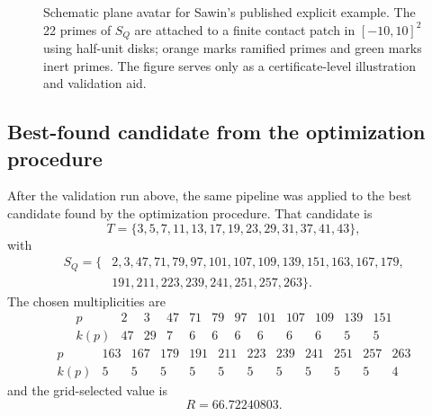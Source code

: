 \documentclass[a4paper,12pt]{article}
\begin{document}
\begin{figure}[htbp]
\caption{Schematic plane avatar for Sawin's published explicit example.  The 22 primes of $S_Q$ are attached to a finite contact patch in $[-10,10]^2$ using half-unit disks; orange marks ramified primes and green marks inert primes.  The figure serves only as a certificate-level illustration and validation aid.}
\label{fig:sawin-plane}
\end{figure}

\subsection*{Best-found candidate from the optimization procedure}



After the validation run above, the same pipeline was applied to the best candidate found by the optimization procedure.  That candidate is
\[
T=\{3,5,7,11,13,17,19,23,29,31,37,41,43\},
\]
with
\[
\begin{split}
S_Q=\{&2,3,47,71,79,97,101,107,109,139,151,163,167,179,\\
      &191,211,223,239,241,251,257,263\}.
\end{split}
\]
The chosen multiplicities are
\[
\begin{array}{c|rrrrrrrrrrr}
p&2&3&47&71&79&97&101&107&109&139&151\\
\hline
k(p)&47&29&7&6&6&6&6&6&6&5&5
\end{array}
\]
\[
\begin{array}{c|rrrrrrrrrrr}
p&163&167&179&191&211&223&239&241&251&257&263\\
\hline
k(p)&5&5&5&5&5&5&5&5&5&5&4
\end{array}
\]
and the grid-selected value is
\[
R=66.72240803.
\]
\end{document}
